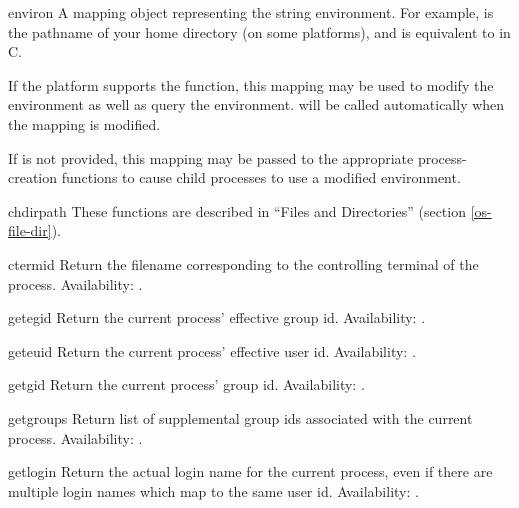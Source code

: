 \begin{datadesc}{environ}
A mapping object representing the string environment. For example,
 is the pathname of your home directory (on some
platforms), and is equivalent to  in C.

If the platform supports the  function, this
mapping may be used to modify the environment as well as query the
environment.   will be called automatically when
the mapping is modified.

If  is not provided, this mapping may be passed to
the appropriate process-creation functions to cause child processes to 
use a modified environment.
\end{datadesc}

\begin{funcdescni}{chdir}{path}
These functions are described in ``Files and Directories'' (section
\ref{os-file-dir}).
\end{funcdescni}

\begin{funcdesc}{ctermid}{}
Return the filename corresponding to the controlling terminal of the
process.
Availability: \UNIX{}.
\end{funcdesc}

\begin{funcdesc}{getegid}{}
Return the current process' effective group id.
Availability: \UNIX{}.
\end{funcdesc}

\begin{funcdesc}{geteuid}{}
Return the current process' effective user id.
Availability: \UNIX{}.
\end{funcdesc}

\begin{funcdesc}{getgid}{}
Return the current process' group id.
Availability: \UNIX{}.
\end{funcdesc}

\begin{funcdesc}{getgroups}{}
Return list of supplemental group ids associated with the current
process.
Availability: \UNIX{}.
\end{funcdesc}

\begin{funcdesc}{getlogin}{}
Return the actual login name for the current process, even if there
are multiple login names which map to the same user id.
Availability: \UNIX{}.
\end{funcdesc}

